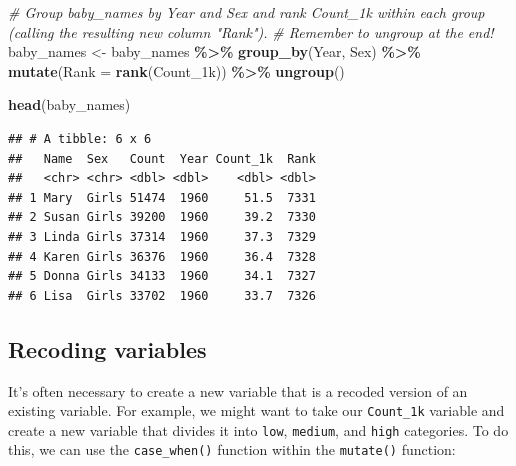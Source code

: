 \documentclass[
]{book}
\newenvironment{Shaded}{\begin{snugshade}}{\end{snugshade}}
\newcommand{\CommentTok}[1]{\textcolor[rgb]{0.56,0.35,0.01}{\textit{#1}}}
\newcommand{\DataTypeTok}[1]{\textcolor[rgb]{0.13,0.29,0.53}{#1}}
\newcommand{\KeywordTok}[1]{\textcolor[rgb]{0.13,0.29,0.53}{\textbf{#1}}}
\newcommand{\NormalTok}[1]{#1}
\newcommand{\OperatorTok}[1]{\textcolor[rgb]{0.81,0.36,0.00}{\textbf{#1}}}
\newcommand{\StringTok}[1]{\textcolor[rgb]{0.31,0.60,0.02}{#1}}
\begin{document}
\begin{Shaded}
\begin{Highlighting}[]
\CommentTok{\# Group baby\_names by Year and Sex and rank Count\_1k within each group (calling the resulting new column "Rank"). }
\CommentTok{\# Remember to ungroup at the end!}
\NormalTok{baby\_names \textless{}{-}}
\StringTok{  }\NormalTok{baby\_names }\OperatorTok{\%\textgreater{}\%}
\StringTok{  }\KeywordTok{group\_by}\NormalTok{(Year, Sex) }\OperatorTok{\%\textgreater{}\%}
\StringTok{  }\KeywordTok{mutate}\NormalTok{(}\DataTypeTok{Rank =} \KeywordTok{rank}\NormalTok{(Count\_1k)) }\OperatorTok{\%\textgreater{}\%}
\StringTok{  }\KeywordTok{ungroup}\NormalTok{()}

\KeywordTok{head}\NormalTok{(baby\_names)}
\end{Highlighting}
\end{Shaded}

\begin{verbatim}
## # A tibble: 6 x 6
##   Name  Sex   Count  Year Count_1k  Rank
##   <chr> <chr> <dbl> <dbl>    <dbl> <dbl>
## 1 Mary  Girls 51474  1960     51.5  7331
## 2 Susan Girls 39200  1960     39.2  7330
## 3 Linda Girls 37314  1960     37.3  7329
## 4 Karen Girls 36376  1960     36.4  7328
## 5 Donna Girls 34133  1960     34.1  7327
## 6 Lisa  Girls 33702  1960     33.7  7326
\end{verbatim}

\hypertarget{recoding-variables}{%
\subsection{Recoding variables}\label{recoding-variables}}

It's often necessary to create a new variable that is a recoded version of an existing variable. For example, we might want to take our \texttt{Count\_1k} variable and create a new variable that divides it into \texttt{low}, \texttt{medium}, and \texttt{high} categories. To do this, we can use the \texttt{case\_when()} function within the \texttt{mutate()} function:
\end{document}
